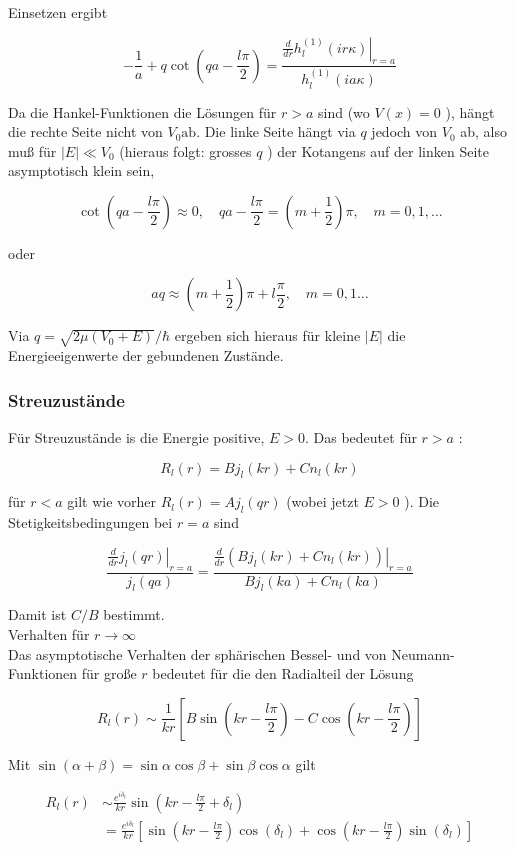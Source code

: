 \documentclass[10pt, letterpaper]{article}
\begin{document}
Einsetzen ergibt

$$
-\frac{1}{a}+q \cot \left(q a-\frac{l \pi}{2}\right)=\frac{\left.\frac{d}{d r} h_{l}^{(1)}(i r \kappa)\right|_{r=a}}{h_{l}^{(1)}(i a \kappa)}
$$

Da die Hankel-Funktionen die Lösungen für $r>a$ sind (wo $V(x)=0$ ), hängt die rechte Seite nicht von $V_{0} \mathrm{ab}$. Die linke Seite hängt via $q$ jedoch von $V_{0}$ ab, also muß für $|E| \ll V_{0}$ (hieraus folgt: grosses $q$ ) der Kotangens auf der linken Seite asymptotisch klein sein,

$$
\cot \left(q a-\frac{l \pi}{2}\right) \approx 0, \quad q a-\frac{l \pi}{2}=\left(m+\frac{1}{2}\right) \pi, \quad m=0,1, \ldots
$$

oder

$$
a q \approx\left(m+\frac{1}{2}\right) \pi+l \frac{\pi}{2}, \quad m=0,1 \ldots
$$

Via $q=\sqrt{2 \mu\left(V_{0}+E\right)} / \hbar$ ergeben sich hieraus für kleine $|E|$ die Energieeigenwerte der gebundenen Zustände.

\subsubsection*{Streuzustände}
Für Streuzustände is die Energie positive, $E>0$. Das bedeutet für $r>a$ :

$$
R_{l}(r)=B j_{l}(k r)+C n_{l}(k r)
$$

für $r<a$ gilt wie vorher $R_{l}(r)=A j_{l}(q r)$ (wobei jetzt $E>0$ ). Die Stetigkeitsbedingungen bei $r=a$ sind

$$
\frac{\left.\frac{d}{d r} j_{l}(q r)\right|_{r=a}}{j_{l}(q a)}=\frac{\left.\frac{d}{d r}\left(B j_{l}(k r)+C n_{l}(k r)\right)\right|_{r=a}}{B j_{l}(k a)+C n_{l}(k a)}
$$

Damit ist $C / B$ bestimmt.\\
Verhalten für $r \rightarrow \infty$\\
Das asymptotische Verhalten der sphärischen Bessel- und von Neumann-Funktionen für große $r$ bedeutet für die den Radialteil der Lösung

$$
R_{l}(r) \sim \frac{1}{k r}\left[B \sin \left(k r-\frac{l \pi}{2}\right)-C \cos \left(k r-\frac{l \pi}{2}\right)\right]
$$

Mit $\sin (\alpha+\beta)=\sin \alpha \cos \beta+\sin \beta \cos \alpha$ gilt

$$
\begin{aligned}
R_{l}(r) & \sim \frac{e^{i \delta_{l}}}{k r} \sin \left(k r-\frac{l \pi}{2}+\delta_{l}\right) \\
& =\frac{e^{i \delta_{l}}}{k r}\left[\sin \left(k r-\frac{l \pi}{2}\right) \cos \left(\delta_{l}\right)+\cos \left(k r-\frac{l \pi}{2}\right) \sin \left(\delta_{l}\right)\right]
\end{aligned}
$$
\end{document}
